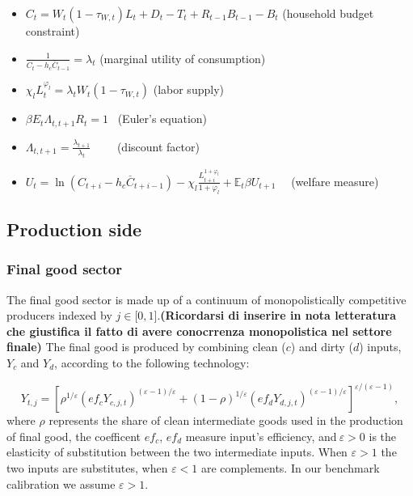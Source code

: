 \documentclass{article}
\begin{document}
\begin{itemize}
\item $C_{t}=W_{t}(1-\tau _{W,t})L_{t}+D_{t}-T_{t}+R_{t-1}B_{t-1}-B_{t}$
(household budget constraint)

\item $\frac{1}{C_{t}-h_{c}\overset{\_}{C}_{t-1}}=\lambda _{t}$ (marginal
utility of consumption)

\item $\chi _{l}L_{t}^{\varphi _{l}}=\lambda _{t}W_{t}(1-\tau _{W,t})$
(labor supply)

\item $\beta E_{t}\Lambda _{t,t+1}R_{t}=1$ \ (Euler's equation)

\item $\Lambda _{t,t+1}=\frac{\lambda _{t+1}}{\lambda _{t}}$ \ \ \ \
(discount factor)

\item $U_{t}=\ln \left( C_{t+i}-h_{c}\overset{\_}{C}_{t+i-1}\right) -\chi
_{l}\frac{L_{t+i}^{1+\varphi _{l}}}{1+\varphi _{l}}+\mathbb{E}_{t}\beta
U_{t+1}$ \ \ (welfare measure)
\end{itemize}

\bigskip

\subsection{Production side}

\subsubsection{Final good sector}

The final good sector is made up of a continuum of monopolistically
competitive  producers indexed by $j\in \lbrack 0,1]$.\textbf{(Ricordarsi di
inserire in nota letteratura che giustifica il fatto di avere conocrrenza
monopolistica nel settore finale)} The final good is produced by combining
clean ($c$) and dirty ($d$) inputs, $Y_{c}$ and $Y_{d}$, according to the
following technology:

\begin{equation}
Y_{t,j}=\left[ \rho ^{1/\varepsilon }\left( ef_{c}Y_{c,j,t}\right) ^{\left(
\varepsilon -1\right) /\varepsilon }+(1-\rho )^{1/\varepsilon }\left(
ef_{d}Y_{d,j,t}\right) ^{\left( \varepsilon -1\right) /\varepsilon }\right]
^{\varepsilon /(\varepsilon -1)},  \label{final_good}
\end{equation}%
where $\rho $ represents the share of clean intermediate goods used in the
production of final good, the coefficent $ef_{c}$, $ef_{d}$ measure input's
efficiency, and$\ \varepsilon >0$ is the elasticity of substitution between
the two intermediate inputs. When $\varepsilon >1$ the two inputs are
substitutes, when $\varepsilon <1$ are complements. In our benchmark
calibration we assume $\varepsilon >1$.
\end{document}
